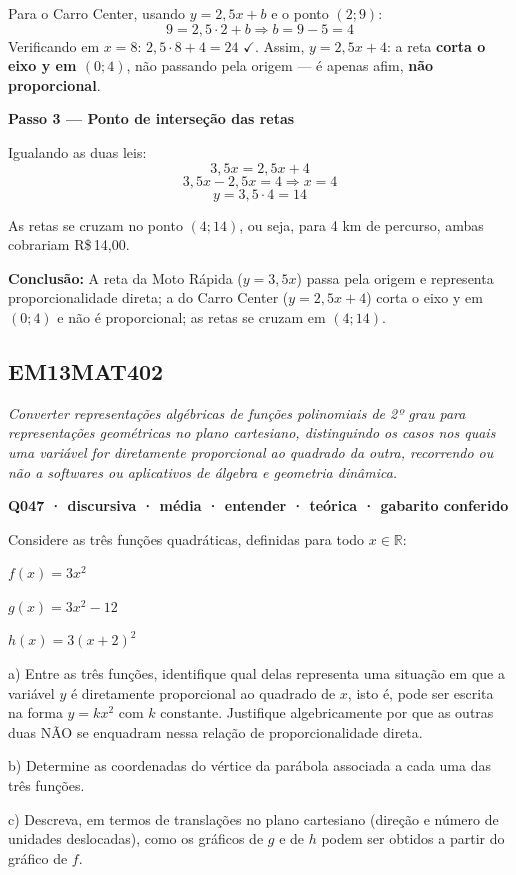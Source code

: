 \documentclass[11pt,a4paper]{article}
\begin{document}
Para o Carro Center, usando $y=2{,}5x+b$ e o ponto $(2;9)$:
$$9=2{,}5\cdot 2+b \Rightarrow b=9-5=4$$
Verificando em $x=8$: $2{,}5\cdot 8+4=24$ $\checkmark$. Assim, $y=2{,}5x+4$: a reta \textbf{corta o eixo y em $(0;4)$}, não passando pela origem — é apenas afim, \textbf{não proporcional}.

\textbf{Passo 3 — Ponto de interseção das retas}

Igualando as duas leis:
$$3{,}5x = 2{,}5x+4$$
$$3{,}5x-2{,}5x=4 \Rightarrow x=4$$
$$y=3{,}5\cdot 4=14$$

As retas se cruzam no ponto $(4;14)$, ou seja, para 4 km de percurso, ambas cobrariam R\$\,14,00.

\textbf{Conclusão:} A reta da Moto Rápida ($y=3{,}5x$) passa pela origem e representa proporcionalidade direta; a do Carro Center ($y=2{,}5x+4$) corta o eixo y em $(0;4)$ e não é proporcional; as retas se cruzam em $(4;14)$.
\subsection*{EM13MAT402}
{\small\itshape Converter representações algébricas de funções polinomiais de 2º grau para representações geométricas no plano cartesiano, distinguindo os casos nos quais uma variável for diretamente proporcional ao quadrado da outra, recorrendo ou não a softwares ou aplicativos de álgebra e geometria dinâmica.}

\bigskip\noindent\textbf{Q047 · discursiva · média · entender · teórica · gabarito conferido}\par\nopagebreak
Considere as três funções quadráticas, definidas para todo $x \in \mathbb{R}$:

$f(x) = 3x^2$

$g(x) = 3x^2 - 12$

$h(x) = 3(x+2)^2$

a) Entre as três funções, identifique qual delas representa uma situação em que a variável $y$ é diretamente proporcional ao quadrado de $x$, isto é, pode ser escrita na forma $y = kx^2$ com $k$ constante. Justifique algebricamente por que as outras duas NÃO se enquadram nessa relação de proporcionalidade direta.

b) Determine as coordenadas do vértice da parábola associada a cada uma das três funções.

c) Descreva, em termos de translações no plano cartesiano (direção e número de unidades deslocadas), como os gráficos de $g$ e de $h$ podem ser obtidos a partir do gráfico de $f$.
\end{document}
